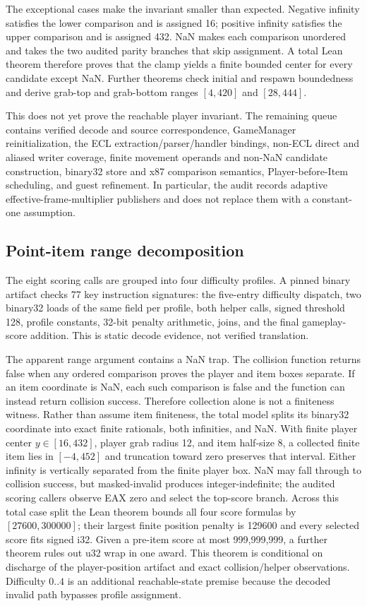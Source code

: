 The exceptional cases make the invariant smaller than expected.  Negative
infinity satisfies the lower comparison and is assigned 16; positive infinity
satisfies the upper comparison and is assigned 432.  NaN makes each comparison
unordered and takes the two audited parity branches that skip assignment.  A
total Lean theorem therefore proves that the clamp yields a finite bounded
center for every candidate except NaN.  Further theorems check initial and
respawn boundedness and derive grab-top and grab-bottom ranges $[4,420]$ and
$[28,444]$.

This does not yet prove the reachable player invariant.  The remaining queue
contains verified decode and source correspondence, GameManager
reinitialization, the ECL extraction/parser/handler bindings, non-ECL direct
and aliased writer coverage, finite movement operands and non-NaN candidate
construction, binary32 store and x87 comparison semantics, Player-before-Item
scheduling, and guest refinement.  In particular, the audit records adaptive
effective-frame-multiplier publishers and does not replace them with a
constant-one assumption.

\subsection{Point-item range decomposition}

The eight scoring calls are grouped into four difficulty profiles.  A pinned
binary artifact checks 77 key instruction signatures: the five-entry
difficulty dispatch, two binary32 loads of the same
 field per profile, both helper calls, signed
threshold 128, profile constants, 32-bit penalty arithmetic, joins, and the
final gameplay-score addition.  This is static decode evidence, not verified
translation.

The apparent range argument contains a NaN trap.  The collision function
returns false when any ordered comparison proves the player and item boxes
separate.  If an item coordinate is NaN, each such comparison is false and the
function can instead return collision success.  Therefore collection alone is
not a finiteness witness.  Rather than assume item finiteness, the total model
splits its binary32 coordinate into exact finite rationals, both infinities,
and NaN.  With finite player center $y\in[16,432]$, player grab radius 12, and
item half-size 8, a collected finite item lies in $[-4,452]$ and truncation
toward zero preserves that interval.  Either infinity is vertically separated
from the finite player box.  NaN may fall through to collision success, but
masked-invalid  produces integer-indefinite; the audited scoring
callers observe EAX zero and select the top-score branch.  Across this total
case split the Lean theorem bounds all four score formulas by
$[27600,300000]$; their largest finite position penalty is 129600 and every
selected score fits signed i32.  Given a pre-item score at most 999,999,999, a
further theorem rules out u32 wrap in one award.  This theorem is conditional
on discharge of the player-position artifact and exact collision/helper
observations.
Difficulty $0..4$ is an additional reachable-state premise because the decoded
invalid path bypasses profile assignment.

